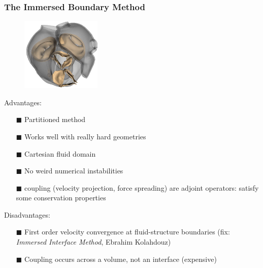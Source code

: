 \documentclass[8pt]{beamer}
\begin{document}
\begin{frame}
    \frametitle{The Immersed Boundary Method}
    \begin{figure}
        \centering
        \includegraphics[width=1.5in]{mov3_Guccione0032.png}
    \end{figure}
    Advantages:
    \begin{itemize}
        \item[$\blacksquare$] Partitioned method
        \item[$\blacksquare$] Works well with really hard geometries
        \item[$\blacksquare$] Cartesian fluid domain
        \item[$\blacksquare$] No weird numerical instabilities
        \item[$\blacksquare$] coupling (velocity projection, force spreading)
        are adjoint operators: satisfy some conservation properties
    \end{itemize}
    Disadvantages:
    \begin{itemize}
        \item[$\blacksquare$] First order velocity convergence at
        fluid-structure boundaries (fix: \emph{Immersed Interface Method},
        Ebrahim Kolahdouz)
        \item[$\blacksquare$] Coupling occurs across a volume, not an interface
        (expensive)
    \end{itemize}
\end{frame}
\end{document}
